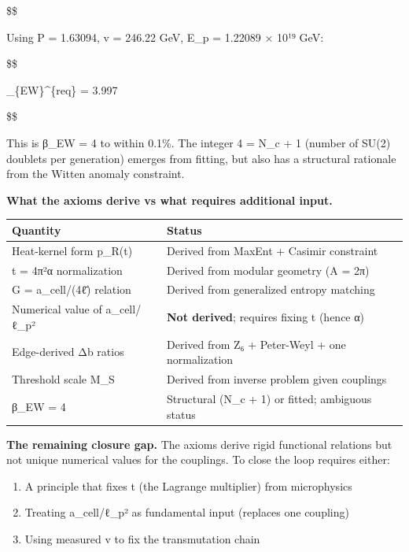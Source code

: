 \documentclass[11pt,a4paper]{article}
\theoremstyle{remark}
\providecommand{\tightlist}{%
  \setlength{\itemsep}{0pt}\setlength{\parskip}{0pt}}
\begin{document}
\$\$

Using P = 1.63094, v = 246.22 GeV, E\_p = 1.22089 × 10¹⁹ GeV:

\$\$

\beta\_\{\rm EW\}\^{}\{\rm req\} = 3.997

\$\$

This is β\_EW = 4 to within 0.1\%. The integer 4 = N\_c + 1 (number of SU(2) doublets per generation) emerges from fitting, but also has a structural rationale from the Witten anomaly constraint.

\textbf{What the axioms derive vs what requires additional input.}

{\def\LTcaptype{none} %
\begin{longtable}[]{@{}
  >{\raggedright\arraybackslash}p{}
  >{\raggedright\arraybackslash}p{}@{}}
\toprule\noalign{}
\begin{minipage}[b]{\linewidth}\raggedright
Quantity
\end{minipage} & \begin{minipage}[b]{\linewidth}\raggedright
Status
\end{minipage} \\
\midrule\noalign{}
\endhead
\bottomrule\noalign{}
\endlastfoot
Heat-kernel form p\_R(t) & Derived from MaxEnt + Casimir constraint \\
t = 4π²α normalization & Derived from modular geometry (A = 2π) \\
G = a\_cell/(4ℓ̄) relation & Derived from generalized entropy matching \\
Numerical value of a\_cell/ℓ\_p² & \textbf{Not derived}; requires fixing t (hence α) \\
Edge-derived Δb ratios & Derived from Z₆ + Peter-Weyl + one normalization \\
Threshold scale M\_S & Derived from inverse problem given couplings \\
β\_EW = 4 & Structural (N\_c + 1) or fitted; ambiguous status \\
\end{longtable}
}

\textbf{The remaining closure gap.} The axioms derive rigid functional relations but not unique numerical values for the couplings. To close the loop requires either:

\begin{enumerate}
\def\labelenumi{\arabic{enumi}.}
\tightlist
\item
  A principle that fixes t (the Lagrange multiplier) from microphysics
\item
  Treating a\_cell/ℓ\_p² as fundamental input (replaces one coupling)
\item
  Using measured v to fix the transmutation chain
\end{enumerate}
\end{document}

